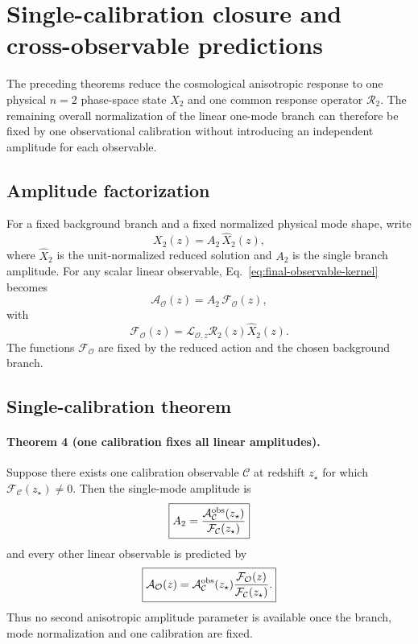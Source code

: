 \section{Single-calibration closure and cross-observable predictions}
\label{sec:bhsm-single-calibration}

The preceding theorems reduce the cosmological anisotropic response to one
physical $n=2$ phase-space state $X_2$ and one common response operator
$\mathcal R_2$.  The remaining overall normalization of the linear one-mode
branch can therefore be fixed by one observational calibration without
introducing an independent amplitude for each observable.

\subsection{Amplitude factorization}

For a fixed background branch and a fixed normalized physical mode shape,
write
\begin{equation}
X_2(z)=A_2\,\widehat X_2(z),
\end{equation}
where $\widehat X_2$ is the unit-normalized reduced solution and $A_2$ is the
single branch amplitude.  For any scalar linear observable,
Eq.~\eqref{eq:final-observable-kernel} becomes
\begin{equation}
\mathcal A_{\mathcal O}(z)
=
A_2\,\mathcal F_{\mathcal O}(z),
\label{eq:observable-F-kernel}
\end{equation}
with
\begin{equation}
\mathcal F_{\mathcal O}(z)
=
\mathcal L_{\mathcal O,z}
\mathcal R_2(z)
\widehat X_2(z).
\end{equation}
The functions $\mathcal F_{\mathcal O}$ are fixed by the reduced action and
the chosen background branch.

\subsection{Single-calibration theorem}

\paragraph{Theorem 4 (one calibration fixes all linear amplitudes).}
Suppose there exists one calibration observable $\mathcal C$ at redshift
$z_\star$ for which
$\mathcal F_{\mathcal C}(z_\star)\neq0$.  Then the single-mode amplitude is
\begin{equation}
\boxed{
A_2
=
\frac{
\mathcal A_{\mathcal C}^{\rm obs}(z_\star)
}{
\mathcal F_{\mathcal C}(z_\star)
}
}
\label{eq:A2-calibration}
\end{equation}
and every other linear observable is predicted by
\begin{equation}
\boxed{
\mathcal A_{\mathcal O}(z)
=
\mathcal A_{\mathcal C}^{\rm obs}(z_\star)
\frac{
\mathcal F_{\mathcal O}(z)
}{
\mathcal F_{\mathcal C}(z_\star)
}.
}
\label{eq:cross-observable-prediction}
\end{equation}
Thus no second anisotropic amplitude parameter is available once the branch,
mode normalization and one calibration are fixed.

